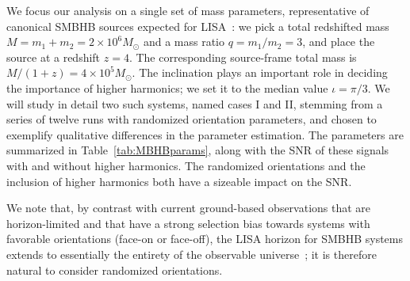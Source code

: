 \documentclass[aps,showpacs,twocolumn,prd,superscriptaddress,nofootinbib]{revtex4-1}
\begin{document}
We focus our analysis on a single set of mass parameters, representative of canonical SMBHB sources expected for LISA~\cite{Barausse12, Klein+15, LISA2017}: we pick a total redshifted mass $M=m_{1}+m_{2} = 2\times10^{6} M_{\odot}$ and a mass ratio $q=m_{1}/m_{2} = 3$, and place the source at a redshift $z=4$. The corresponding source-frame total mass is $M/(1+z) = 4\times10^{5} M_{\odot}$. The inclination plays an important role in deciding the importance of higher harmonics; we set it to the median value $\iota = \pi/3$. We will study in detail two such systems, named cases I and II, stemming from a series of twelve runs with randomized orientation parameters, and chosen to exemplify qualitative differences in the parameter estimation. The parameters are summarized in Table~\ref{tab:MBHBparams}, along with the SNR of these signals with and without higher harmonics. The randomized orientations and the inclusion of higher harmonics both have a sizeable impact on the SNR.

We note that, by contrast with current ground-based observations that are horizon-limited and that have a strong selection bias towards systems with favorable orientations (face-on or face-off), the LISA horizon for SMBHB systems extends to essentially the entirety of the observable universe~\cite{LISA2017}; it is therefore natural to consider randomized orientations.
\end{document}
